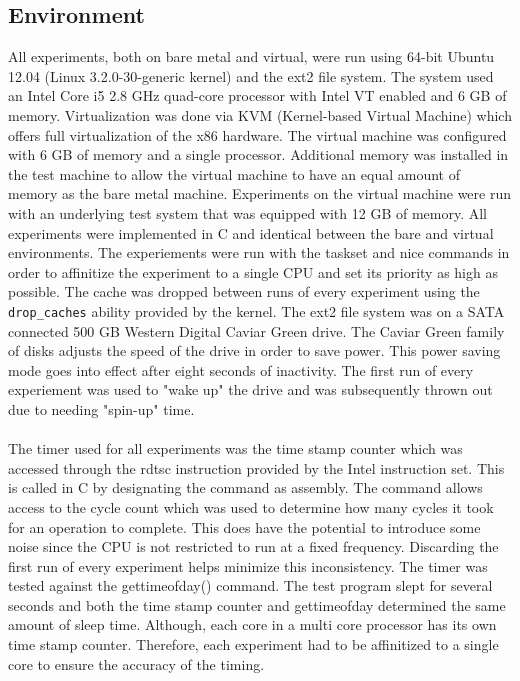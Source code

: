 \documentclass[letterpaper,twocolumn,10pt]{article}
\begin{document}
\subsection{Environment}
All experiments, both on bare metal and virtual, were run using 64-bit Ubuntu 12.04 (Linux 3.2.0-30-generic kernel) and the ext2 file system.
The system used an Intel Core i5 2.8 GHz quad-core processor with Intel VT enabled and 6 GB of memory.
Virtualization was done via KVM (Kernel-based Virtual Machine) which offers full virtualization of the x86 hardware.
The virtual machine was configured with 6 GB of memory and a single processor.
Additional memory was installed in the test machine to allow the virtual machine to have an equal amount of memory as the bare metal machine.
Experiments on the virtual machine were run with an underlying test system that was equipped with 12 GB of memory.
All experiments were implemented in C and identical between the bare and virtual environments. 
The experiements were run with the taskset and nice commands in order to affinitize the experiment to a single CPU and set its priority as high as possible.
The cache was dropped between runs of every experiment using the \texttt{drop\_caches} ability provided by the kernel.
The ext2 file system was on a SATA connected 500 GB Western Digital Caviar Green drive. 
The Caviar Green family of disks adjusts the speed of the drive in order to save power. 
This power saving mode goes into effect after eight seconds of inactivity.
The first run of every experiement was used to "wake up" the drive and was subsequently thrown out due to needing "spin-up" time. 

\paragraph{}
The timer used for all experiments was the time stamp counter which was accessed through the rdtsc instruction provided by the Intel instruction set. 
This is called in C by designating the command as assembly. 
The command allows access to the cycle count which was used to determine how many cycles it took for an operation to complete. 
This does have the potential to introduce some noise since the CPU is not restricted to run at a fixed frequency. 
Discarding the first run of every experiment helps minimize this inconsistency. 
The timer was tested against the gettimeofday() command. 
The test program slept for several seconds and both the time stamp counter and gettimeofday determined the same amount of sleep time. 
Although, each core in a multi core processor has its own time stamp counter.
Therefore, each experiment had to be affinitized to a single core to ensure the accuracy of the timing. 
\end{document}
